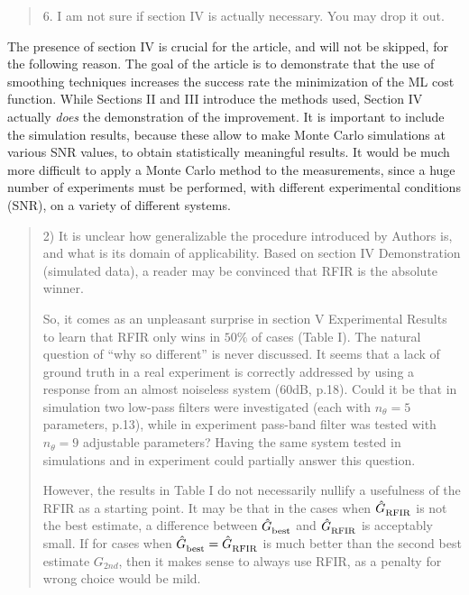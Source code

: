 \begin{quote}
6. I am not sure if section IV is actually necessary. You may drop it out. 
\end{quote}

The presence of section IV is crucial for the article, and will not be skipped, for the following reason. 
The goal of the article is to demonstrate that the use of smoothing techniques increases the success rate the minimization of the ML cost function. 
While Sections II and III introduce the methods used, Section IV actually \emph{does} the demonstration of the improvement. 
It is important to include the simulation results, because these allow to make Monte Carlo simulations at various SNR values, to obtain statistically meaningful results. 
It would be much more difficult to apply a Monte Carlo method to the measurements, since a huge number of experiments must be performed, with different experimental conditions (SNR), on a variety of different systems.

\begin{quote}
2) It is unclear how generalizable the procedure introduced by Authors is, and what is its domain of applicability. Based on section IV Demonstration (simulated data), a reader may be convinced that RFIR is the absolute winner.

So, it comes as an unpleasant surprise in section V Experimental Results to learn that RFIR only wins in $50\%$ of cases (Table I). The natural question of ``why so different'' is never discussed. It seems that a lack of ground truth in a real experiment is correctly addressed by using a response from an almost noiseless system (60dB, p.18). Could it be that in simulation two low-pass filters were investigated (each with $n_{\theta} = 5$ parameters, p.13), while in experiment pass-band filter was tested with $n_{\theta} = 9$ adjustable parameters? Having the same system tested in simulations and in experiment could partially answer this question. 

However, the results in Table I do not necessarily nullify a usefulness of the RFIR as a starting point. It may be that in the cases when $\hat{G}_{\mathrm{RFIR}}^{\mathrm{}}$ is not the best estimate, a difference between $\hat{G}_{\mathrm{best}}^{\mathrm{}}$ and $\hat{G}_{\mathrm{RFIR}}^{\mathrm{}}$ is acceptably small. If for cases when $\hat{G}_{\mathrm{best}}^{\mathrm{}} = \hat{G}_{\mathrm{RFIR}}^{\mathrm{}}$ is much better than the second best estimate $G_{2nd}$, then it makes sense to always use RFIR, as a penalty for wrong choice would be mild. 

\end{quote}

